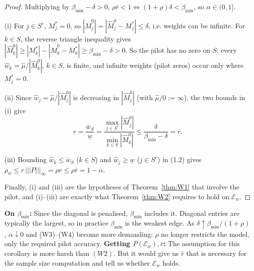 \documentclass[11pt,a4paper]{article}
\numberwithin{equation}{section}
\theoremstyle{plain}
\theoremstyle{remark}
\begin{document}
\begin{proof}
Multiplying by $\beta_{\min}-\delta>0$, $\rho\bar r<1\iff(1+\rho)\delta<\beta_{\min}$, so $\alpha\in(0,1]$.

(i) For $j\in S^c$, $M^*_j=0$, so $|\hat M^0_j|=|\hat M^0_j-M^*_j|\le\delta$, i.e. weights can be infinite. For $k\in S$, the
reverse triangle inequality gives
$|\hat M^0_k|\ge|M^*_k|-|\hat M^0_k-M^*_k|\ge\beta_{\min}-\delta>0$.
So the pilot has no zero on $S$: every $\hat w_k=\hat\mu/|\hat M^0_k|$, $k\in S$, is finite, and
infinite weights (pilot zeros) occur only where $M^*_j=0$.

(ii) Since $\hat w_j=\hat\mu/|\hat M^0_j|$ is decreasing in $|\hat M^0_j|$ (with $\hat\mu/0:=\infty$),
the two bounds in (i) give
\[
  r=\frac{\bar w_S}{\underline w}
   =\frac{\max_{j\in S^c}|\hat M^0_j|}{\min_{k\in S}|\hat M^0_k|}
   \le\frac{\delta}{\beta_{\min}-\delta}=\bar r .
\]

(iii) Bounding $\hat w_k\le\bar w_S$ ($k\in S$) and $\hat w_j\ge\underline w$ ($j\in S^c$) in (1.2)
gives $\rho_w\le r\,|||P|||_\infty=\rho r\le\rho\bar r=1-\alpha$.

Finally, (i) and (iii) are the hypotheses of Theorem~\ref{thm:W1} that involve the pilot, and
(i)--(iii) are exactly what Theorem~\ref{thm:W2} requires to hold on $\mathcal E_w$.
\end{proof}

\noindent
\textbf{On $\beta_{\min}$:} Since the diagonal is penalised, $\beta_{\min}$ includes it. Diagonal entries are typically the
largest, so in practice $\beta_{\min}$ is the weakest edge. As $\delta\uparrow\beta_{\min}/(1+\rho)$,
$\alpha\downarrow0$ and (W3)--(W4) become more demanding: $\rho$ no longer restricts the model,
only the required pilot accuracy.
\textbf{Getting $P(\mathcal E_w), \bar{r}$:} The assumption for this corollary is more harsh than $(W2)$. But it would give us $\bar{r}$ that is necessary for the sample size computation and tell us whether $\mathcal E_w$ holds.
\end{document}
